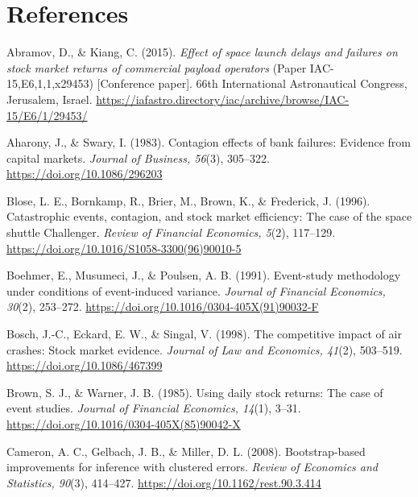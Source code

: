 \documentclass[12pt,a4paper]{article}
\begin{document}
\clearpage
\section*{\hypertarget{refs}{}References}
{\raggedright\setlength{\parskip}{8pt}
\noindent\hypertarget{ref-abramov2015}{}\hangindent=0.5in Abramov, D., \& Kiang, C. (2015). \emph{Effect of space launch delays and failures on stock market returns of commercial payload operators} (Paper IAC-15,E6,1,1,x29453) [Conference paper]. 66th International Astronautical Congress, Jerusalem, Israel. \url{https://iafastro.directory/iac/archive/browse/IAC-15/E6/1/29453/}\par
\noindent\hypertarget{ref-aharony1983}{}\hangindent=0.5in Aharony, J., \& Swary, I. (1983). Contagion effects of bank failures: Evidence from capital markets. \emph{Journal of Business, 56}(3), 305--322. \url{https://doi.org/10.1086/296203}\par
\noindent\hypertarget{ref-blose1996}{}\hangindent=0.5in Blose, L. E., Bornkamp, R., Brier, M., Brown, K., \& Frederick, J. (1996). Catastrophic events, contagion, and stock market efficiency: The case of the space shuttle Challenger. \emph{Review of Financial Economics, 5}(2), 117--129. \url{https://doi.org/10.1016/S1058-3300(96)90010-5}\par
\noindent\hypertarget{ref-boehmer1991}{}\hangindent=0.5in Boehmer, E., Musumeci, J., \& Poulsen, A. B. (1991). Event-study methodology under conditions of event-induced variance. \emph{Journal of Financial Economics, 30}(2), 253--272. \url{https://doi.org/10.1016/0304-405X(91)90032-F}\par
\noindent\hypertarget{ref-bosch1998}{}\hangindent=0.5in Bosch, J.-C., Eckard, E. W., \& Singal, V. (1998). The competitive impact of air crashes: Stock market evidence. \emph{Journal of Law and Economics, 41}(2), 503--519. \url{https://doi.org/10.1086/467399}\par
\noindent\hypertarget{ref-brown1985}{}\hangindent=0.5in Brown, S. J., \& Warner, J. B. (1985). Using daily stock returns: The case of event studies. \emph{Journal of Financial Economics, 14}(1), 3--31. \url{https://doi.org/10.1016/0304-405X(85)90042-X}\par
\noindent\hypertarget{ref-cameron2008}{}\hangindent=0.5in Cameron, A. C., Gelbach, J. B., \& Miller, D. L. (2008). Bootstrap-based improvements for inference with clustered errors. \emph{Review of Economics and Statistics, 90}(3), 414--427. \url{https://doi.org/10.1162/rest.90.3.414}\par
}
\end{document}

